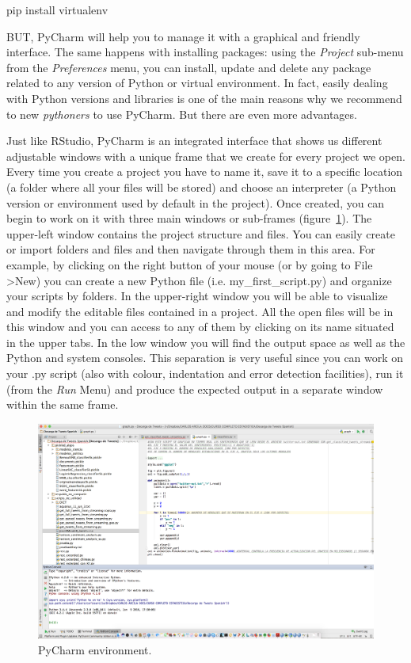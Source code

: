 \begin{terminal}
pip install virtualenv
\end{terminal} 
 
BUT, PyCharm will help you to manage it with a graphical and friendly interface. The same happens with installing packages: using the \textit{Project} sub-menu from the \textit{Preferences} menu, you can install, update and delete any package related to any version of Python or virtual environment. In fact, easily dealing with Python versions and libraries is one of the main reasons why we recommend to new \textit{pythoners} to use PyCharm. But there are even more advantages.

Just like RStudio, PyCharm is an integrated interface that shows us different adjustable windows with a unique frame that we create for every project we open. Every time you create a project you have to name it, save it to a specific location (a folder where all your files will be stored) and choose an interpreter (a Python version or environment used by default in the project). Once created, you can begin to work on it with three main windows or sub-frames (figure~\ref{fig:pycharm}). The upper-left window contains the project structure and files. You can easily create or import folders and files and then navigate through them in this area. For example, by clicking on the right button of your mouse (or by going to File \textgreater New) you can create a new Python file (i.e. my\_first\_script.py) and organize your scripts by folders. In the upper-right window you will be able to visualize and modify the editable files contained in a project. All the open files will be in this window and you can access to any of them by clicking on its name situated in the upper tabs. In the low window you will find the output space as well as the Python and system consoles. This separation is very useful since you can work on your .py script (also with colour, indentation and error detection facilities), run it (from the \textit{Run} Menu) and produce the expected output in a separate window within the same frame.

\begin{figure}
\centering
\includegraphics[width=0.9\linewidth]{figures/ch3_pycharm}
\caption{PyCharm environment.}
\label{fig:pycharm}
\end{figure}

